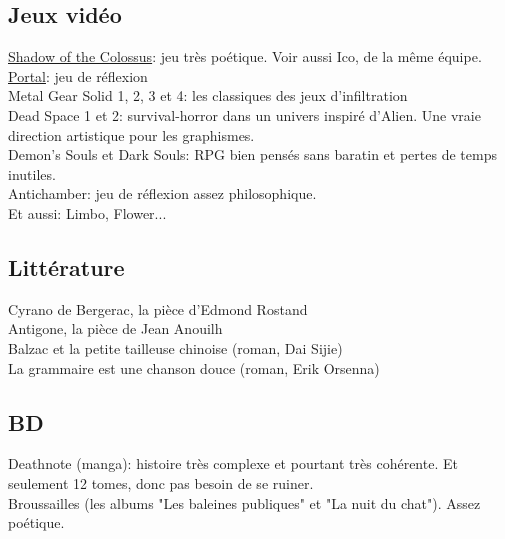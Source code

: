 \subsection{Jeux vidéo}
\href{http://www.jeuxvideo.com/jeux/playstation-3-ps3/00037095-classics-hd-ico-shadow-of-the-colossus.htm}{Shadow of the Colossus}: jeu très poétique. Voir aussi Ico, de la même équipe.\\
\href{http://www.jeuxvideo.com/jeux/playstation-3-ps3/00020227-portal.htm}{Portal}: jeu de réflexion\\
Metal Gear Solid 1, 2, 3 et 4: les classiques des jeux d'infiltration\\
Dead Space 1 et 2: survival-horror dans un univers inspiré d'Alien. Une vraie direction artistique pour les graphismes.\\
Demon's Souls et Dark Souls: RPG bien pensés sans baratin et pertes de temps inutiles.\\
Antichamber: jeu de réflexion assez philosophique.\\
Et aussi: Limbo, Flower...\\

\subsection{Littérature}
Cyrano de Bergerac, la pièce d'Edmond Rostand\\
Antigone, la pièce de Jean Anouilh\\
Balzac et la petite tailleuse chinoise (roman, Dai Sijie)\\
La grammaire est une chanson douce (roman, Erik Orsenna)\\

\subsection{BD}
Deathnote (manga): histoire très complexe et pourtant très cohérente. Et seulement 12 tomes, donc pas besoin de se ruiner.\\
Broussailles (les albums "Les baleines publiques" et "La nuit du chat"). Assez poétique.\\






